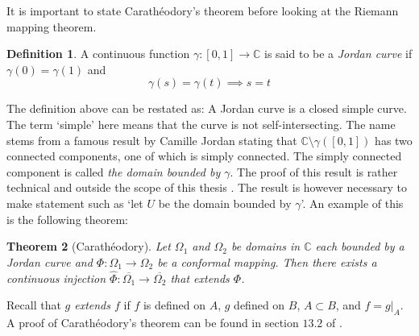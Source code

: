 \documentclass[a4paper,12pt,twoside,BCOR=10mm]{scrbook}
\newtheorem{theorem}{Theorem}[section]
\theoremstyle{definition}
\theoremstyle{definition}
\theoremstyle{definition}
\newtheorem{definition}[theorem]{Definition}
\begin{document}
It is important to state Carathéodory's theorem before looking at the Riemann mapping theorem.
\begin{definition}
\label{index7}
A continuous function $\gamma: [0, 1] \rightarrow \mathbb{C}$ is said to be a \emph{Jordan curve} if $\gamma(0) = \gamma(1)$ and
\[
	\gamma(s) = \gamma(t) \implies s = t \tag*{for all $s, t \in ]0, 1[$.}
\]
\end{definition}
The definition above can be restated as: A Jordan curve is a closed simple curve.
The term `simple' here means that the curve is not self-intersecting.
The name stems from a famous result by Camille Jordan stating that $\mathbb{C} \setminus \gamma([0, 1])$ has two connected components, one of which is simply connected.
The simply connected component is called \emph{the domain bounded by $\gamma$}.
The proof of this result is rather technical and outside the scope of this thesis \citep{munkres, greenkrantz}.
The result is however necessary to make statement such as `let $U$ be the domain bounded by $\gamma$'.
An example of this is the following theorem:
\begin{theorem}[Carathéodory]
Let $\Omega_1$ and $\Omega_2$ be domains in $\mathbb{C}$ each bounded by a Jordan curve and $\Phi: \Omega_1 \rightarrow \Omega_2$ be a conformal mapping.
Then there exists a continuous injection $\hat{\Phi}: \overline{\Omega_1} \rightarrow \overline{\Omega_2}$ that extends $\Phi$.
\end{theorem}
\label{index8}
Recall that \emph{$g$ extends $f$} if
	$f$ is defined on $A$,
	$g$ defined on $B$,
	$A \subset B$,
	and $f = g|_A$.
A proof of Carathéodory's theorem can be found in section $13.2$ of \citep{greenkrantz}.
\end{document}

